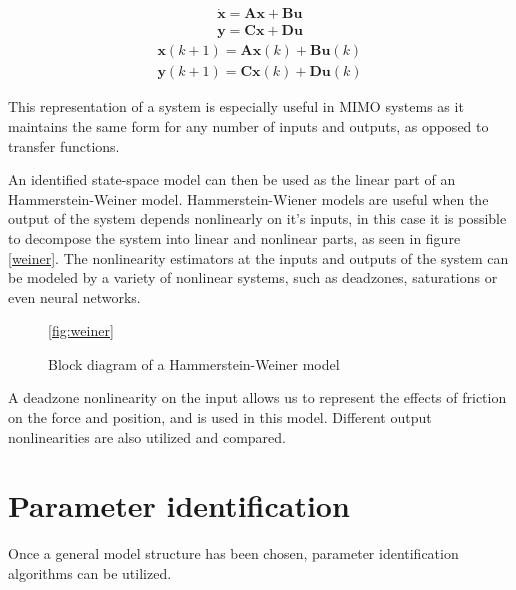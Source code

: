 \begin{align}\label{eq:ssc}
\dot{\mathbf{x}} = \mathbf{A}\mathbf{x} + \mathbf{B}\mathbf{u} \\
\mathbf{y} = \mathbf{C}\mathbf{x} + \mathbf{D}\mathbf{u}
\end{align}
\begin{align}\label{eq:ssd}
\mathbf{x}(k+1) = \mathbf{A}\mathbf{x}(k) + \mathbf{B}\mathbf{u}(k)\\
\mathbf{y}(k+1) = \mathbf{C}\mathbf{x}(k) + \mathbf{D}\mathbf{u}(k)
\end{align}

This representation of a system is especially useful in MIMO systems as it maintains the same form for any number of inputs and outputs, as opposed to transfer functions.

An identified state-space model can then be used as the linear part of an Hammerstein-Weiner model.
Hammerstein-Wiener models are useful when the output of the system depends nonlinearly on it's inputs, in this case it is possible to decompose the system into linear and nonlinear parts, as seen in figure \ref{weiner}. 
The nonlinearity estimators at the inputs and outputs of the system can be modeled by a variety of nonlinear systems, such as deadzones, saturations or even neural networks.

\begin{figure} \ref{fig:weiner}
\caption{Block diagram of a Hammerstein-Weiner model}
\end{figure}

A deadzone nonlinearity on the input allows us to represent the effects of friction on the force and position, and is used in this model.
Different output nonlinearities are also utilized and compared.

\section{Parameter identification}
Once a general model structure has been chosen, parameter identification algorithms can be utilized.

